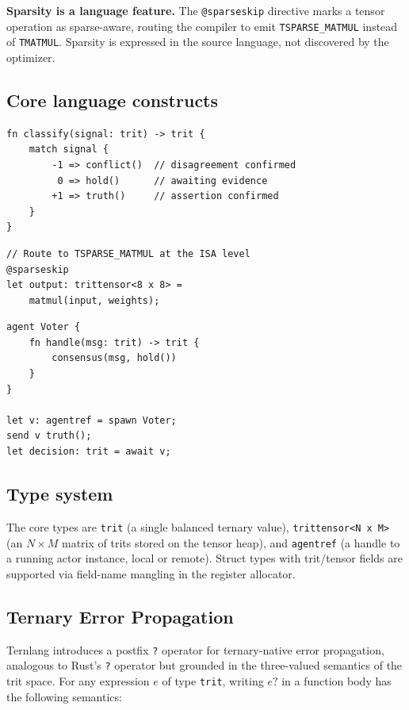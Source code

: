 \documentclass[journal,10pt,twocolumn]{IEEEtran}
\begin{document}
\textbf{Sparsity is a language feature.} The \texttt{@sparseskip} directive
marks a tensor operation as sparse-aware, routing the compiler to emit
\texttt{TSPARSE\_MATMUL} instead of \texttt{TMATMUL}. Sparsity is expressed
in the source language, not discovered by the optimizer.

\subsection{Core language constructs}

\begin{lstlisting}[caption={Ternary classifier with exhaustive match}]
fn classify(signal: trit) -> trit {
    match signal {
        -1 => conflict()  // disagreement confirmed
         0 => hold()      // awaiting evidence
        +1 => truth()     // assertion confirmed
    }
}
\end{lstlisting}

\begin{lstlisting}[caption={Sparse matrix multiply with @sparseskip}]
// Route to TSPARSE_MATMUL at the ISA level
@sparseskip
let output: trittensor<8 x 8> =
    matmul(input, weights);
\end{lstlisting}

\begin{lstlisting}[caption={Actor model for ternary message passing}]
agent Voter {
    fn handle(msg: trit) -> trit {
        consensus(msg, hold())
    }
}

let v: agentref = spawn Voter;
send v truth();
let decision: trit = await v;
\end{lstlisting}

\subsection{Type system}

The core types are \texttt{trit} (a single balanced ternary value),
\texttt{trittensor<N x M>} (an $N \times M$ matrix of trits stored on the
tensor heap), and \texttt{agentref} (a handle to a running actor instance,
local or remote). Struct types with trit/tensor fields are supported via
field-name mangling in the register allocator.

\subsection{Ternary Error Propagation}
\label{subsec:propagate}

Ternlang introduces a postfix \texttt{?} operator for ternary-native error
propagation, analogous to Rust's \texttt{?} operator but grounded in the
three-valued semantics of the trit space. For any expression $e$ of type
\texttt{trit}, writing $e\texttt{?}$ in a function body has the following
semantics:
\end{document}
